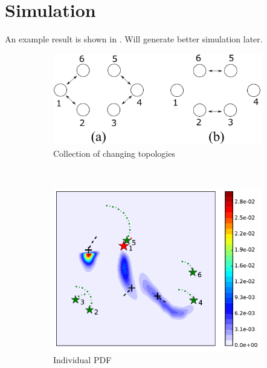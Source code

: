 \section{Simulation}\label{sec:sim}
	An example result is shown in . Will generate better simulation later.
	
	\begin{figure}%
		\centering
		\begin{subfigure}[b]{0.3\textwidth}
			\includegraphics[width=\textwidth]{figures/com_topo1}
			\caption{Collection of changing topologies}\label{fig:com_topo1}
		\end{subfigure}
		~
		\begin{subfigure}[b]{0.23\textwidth}
			\includegraphics[width=\textwidth]{figures/hetero_mov_sen_mov_tar_rbt1_step5}
			\caption{Individual PDF}\label{fig:sta_sen_sta_tar_top1_init_dbf}
		\end{subfigure}
		\begin{subfigure}[b]{0.23\textwidth}

\end{subfigure}
\end{figure}
